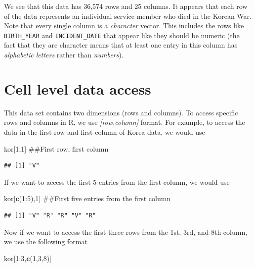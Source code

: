 \documentclass[]{book}
\newenvironment{Shaded}{\begin{snugshade}}{\end{snugshade}}
\newcommand{\KeywordTok}[1]{\textcolor[rgb]{0.13,0.29,0.53}{\textbf{{#1}}}}
\newcommand{\DecValTok}[1]{\textcolor[rgb]{0.00,0.00,0.81}{{#1}}}
\newcommand{\NormalTok}[1]{{#1}}
\begin{document}
We see that this data has 36,574 rows and 25 columns. It appears that
each row of the data represents an individual service member who died in
the Korean War. Note that every single column is a \emph{character}
vector. This includes the rows like \texttt{BIRTH\_YEAR} and
\texttt{INCIDENT\_DATE} that appear like they should be numeric (the
fact that they are character means that at least one entry in this
column has \emph{alphabetic letters} rather than \emph{numbers}).

\section{Cell level data access}\label{cell-level-data-access}

This data set contains two dimensions (rows and columns). To access
specific rows and columns in R, we use \emph{{[}row,column{]}} format.
For example, to access the data in the first row and first column of
Korea data, we would use

\begin{Shaded}
\begin{Highlighting}[]
\NormalTok{kor[}\DecValTok{1}\NormalTok{,}\DecValTok{1}\NormalTok{]  ##First row, first column}
\end{Highlighting}
\end{Shaded}

\begin{verbatim}
## [1] "V"
\end{verbatim}

If we want to access the first 5 entries from the first column, we would
use

\begin{Shaded}
\begin{Highlighting}[]
\NormalTok{kor[}\KeywordTok{c}\NormalTok{(}\DecValTok{1}\NormalTok{:}\DecValTok{5}\NormalTok{),}\DecValTok{1}\NormalTok{] ##First five entries from the first column}
\end{Highlighting}
\end{Shaded}

\begin{verbatim}
## [1] "V" "R" "R" "V" "R"
\end{verbatim}

Now if we want to access the first three rows from the 1st, 3rd, and 8th
column, we use the following format

\begin{Shaded}
\begin{Highlighting}[]
\NormalTok{kor[}\DecValTok{1}\NormalTok{:}\DecValTok{3}\NormalTok{,}\KeywordTok{c}\NormalTok{(}\DecValTok{1}\NormalTok{,}\DecValTok{3}\NormalTok{,}\DecValTok{8}\NormalTok{)]}
\end{Highlighting}
\end{Shaded}
\end{document}
